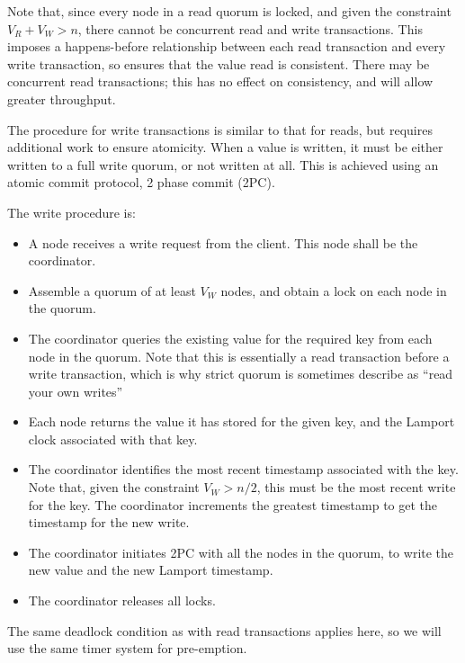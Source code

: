 \documentclass[12pt,a4paper,twoside,openright]{report}
\begin{document}
Note that, since every node in a read quorum is locked, and given the constraint $V_R + V_W > n$, there cannot be concurrent read and write transactions. This imposes a happens-before relationship between each read transaction and every write transaction, so ensures that the value read is consistent. There may be concurrent read transactions; this has no effect on consistency, and will allow greater throughput.

The procedure for write transactions is similar to that for reads, but requires additional work to ensure atomicity. When a value is written, it must be either written to a full write quorum, or not written at all. This is achieved using an atomic commit protocol, 2 phase commit (2PC).

The write procedure is:

\begin{itemize}
  \item
  A node receives a write request from the client. This node shall be the coordinator.

  \item
  Assemble a quorum of at least $V_W$ nodes, and obtain a lock on each node in the quorum.

  \item
  The coordinator queries the existing value for the required key from each node in the quorum. Note that this is essentially a read transaction before a write transaction, which is why strict quorum is sometimes describe as ``read your own writes''

  \item
  Each node returns the value it has stored for the given key, and the Lamport clock associated with that key.

  \item
  The coordinator identifies the most recent timestamp associated with the key. Note that, given the constraint $V_W > n / 2$, this must be the most recent write for the key. The coordinator increments the greatest timestamp to get the timestamp for the new write.

  \item
  The coordinator initiates 2PC with all the nodes in the quorum, to write the new value and the new Lamport timestamp.

  \item
  The coordinator releases all locks.

\end{itemize}

The same deadlock condition as with read transactions applies here, so we will use the same timer system for pre-emption.
\end{document}
